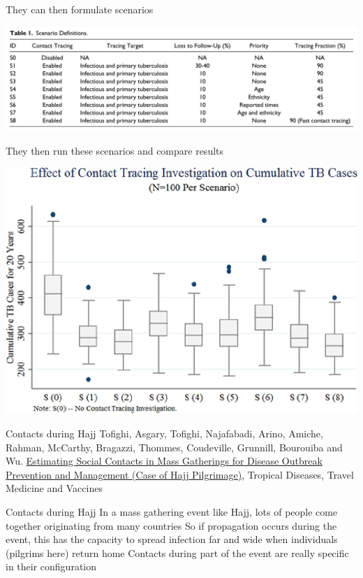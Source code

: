 \documentclass[aspectratio=43]{beamer}
\begin{document}
\begin{frame}
They can then formulate scenarios
\begin{center}
\includegraphics[width=\textwidth]{FIGS/TianOsgood_etal_scenarios.jpeg}
\end{center}
They then run these scenarios and compare results
\end{frame}


\begin{frame}
\begin{center}
\includegraphics[width=\textwidth]{FIGS/TianOsgood_etal_scenario_results.jpeg}
\end{center}
\end{frame}


\begin{frame}{Contacts during Hajj}
Tofighi, Asgary, Tofighi, Najafabadi, Arino, Amiche, Rahman, McCarthy, Bragazzi, Thommes,  Coudeville, Grunnill, Bourouiba and Wu. \href{http://dx.doi.org/10.2139/ssrn.3678581}{Estimating Social Contacts in Mass Gatherings for Disease Outbreak Prevention and Management (Case of Hajj Pilgrimage)}, Tropical Diseases, Travel Medicine and Vaccines
\end{frame}

\begin{frame}{Contacts during Hajj}
In a mass gathering event like Hajj, lots of people come together originating from many countries
\vfill
So if propagation occurs during the event, this has the capacity to spread infection far and wide when individuals (pilgrims here) return home
\vfill
Contacts during part of the event are really specific in their configuration
\end{frame}
\end{document}
